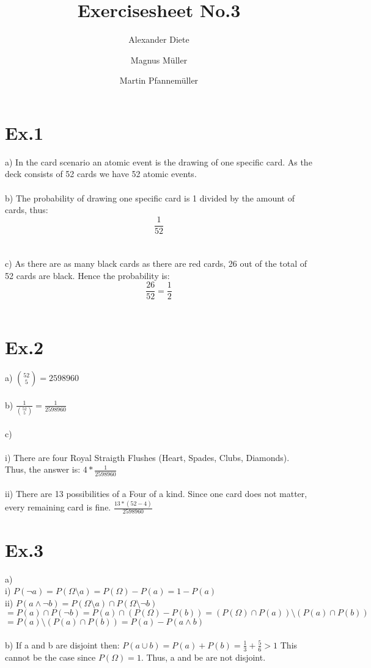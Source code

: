 \documentclass[11pt]{article}
\title{Exercisesheet No.3}
\author{Alexander Diete \and Magnus M\"uller \and Martin Pfannem\"uller}
\begin{document}
\maketitle

\section*{Ex.1}

a)
In the card scenario an atomic event is the drawing of one specific card. As the deck consists of 52 cards we have 52 atomic events. \\
\\
b) The probability of drawing one specific card is 1 divided by the amount of cards, thus: 
$$\frac{1}{52}$$ \\
\\
c)
As there are as many black cards as there are red cards, 26 out of the total of 52 cards are black. Hence the probability is:
$$\frac{26}{52} = \frac{1}{2}$$ \\

\section*{Ex.2}

a) $\binom{52}{5} = 2598960$ \\
\\
b) $\frac{1}{\binom{52}{5}} = \frac{1}{2598960}$ \\
\\
c) \\
\\
i) There are four Royal Straigth Flushes (Heart, Spades, Clubs, Diamonds). Thus, the answer is: $4 * \frac{1}{2598960}$ \\
\\
ii) There are 13 possibilities of a Four of a kind. Since one card does not matter, every remaining card is fine. $\frac{13*(52-4)}{2598960}$

\section*{Ex.3}
a)\\
i) $P(\neg a) = P(\Omega \setminus a) = P(\Omega) - P(a) = 1 - P(a)$ \\
ii) $P(a \wedge \neg b) = P(\Omega \setminus a) \cap P(\Omega \setminus \neg b)$ \\
$ = P(a) \cap P(\neg b) = P(a) \cap (P(\Omega) - P(b)) = (P(\Omega) \cap P(a)) \setminus (P(a) \cap P(b))$ \\
$= P(a) \setminus (P(a) \cap P(b)) = P(a) - P(a \wedge b)$ \\
\\
b) If a and b are disjoint then: $P(a \cup b) = P(a) + P(b) = \frac{1}{3} + \frac{5}{6} > 1$ This cannot be the case since $P(\Omega) = 1$. Thus, a and be are not disjoint. \\
\end{document}
